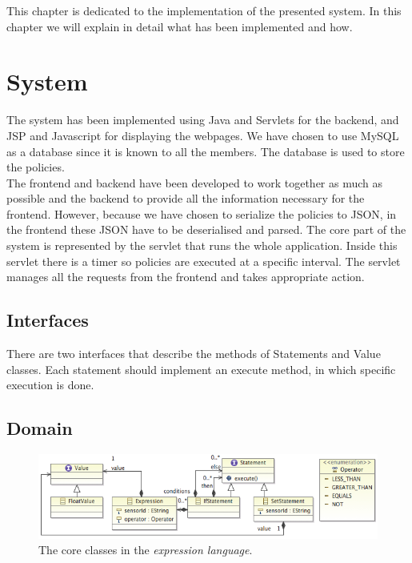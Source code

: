 This chapter is dedicated to the implementation of the presented system. In this chapter we will explain in detail what has been implemented and how. 

\section{System}
The system has been implemented using Java and Servlets for the backend, and JSP and Javascript for displaying the webpages. We have chosen to use MySQL as a database since it is known to all the members. The database is used to store the policies. 
\\The frontend and backend have been developed to work together as much as possible and the backend to provide all the information necessary for the frontend. However, because we have chosen to serialize the policies to JSON, in the frontend these JSON have to be deserialised and parsed. 
The core part of the system is represented by the servlet that runs the whole application. Inside this servlet there is a timer so policies are executed at a specific interval. The servlet manages all the requests from the frontend and takes appropriate action. 
\subsection{Interfaces}
There are two interfaces that describe the methods of Statements and Value classes. Each statement should implement an execute method, in which specific execution is done. 
\subsection{Domain}
\begin{figure}
	\centering
    \includegraphics[scale=0.55]{chapters/implementation-model-expression-language.png} 
	\caption{The core classes in the \textit{expression language}.}
	\label{fig:ecore-sensors-actuators}
\end{figure}

